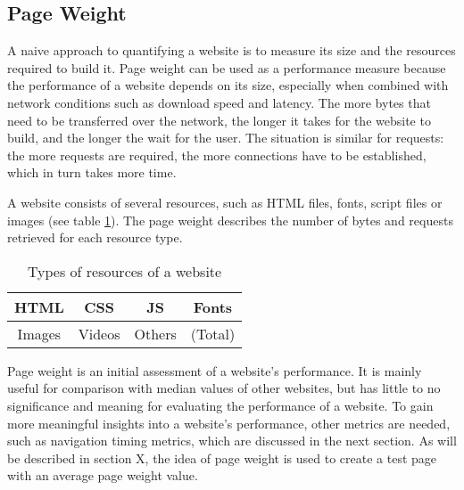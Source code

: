 




\subsection{Page Weight} %
\label{subsection:page_weight}

A naive approach to quantifying a website is to measure its size and the resources required to build it.
Page weight can be used as a performance measure because the performance of a website depends on its size, especially when combined with network conditions such as download speed and latency.
The more bytes that need to be transferred over the network, the longer it takes for the website to build, and the longer the wait for the user.
The situation is similar for requests: the more requests are required, the more connections have to be established, which in turn takes more time.

A website consists of several resources, such as HTML files, fonts, script files or images (see table \ref{table:website_resources}).
The page weight describes the number of bytes and requests retrieved for each resource type. %

\begin{table}[h]
	\small
	\centering
	\begin{tabular}{| c | c | c | c | }
	\hline
	HTML & CSS  & JS & Fonts \\
	\hline
	Images & Videos & Others & (Total) \\
	\hline
	\end{tabular}
	\medskip
	\caption{Types of resources of a website}
	\label{table:website_resources}
\end{table}

Page weight is an initial assessment of a website's performance.
It is mainly useful for comparison with median values of other websites, but has little to no significance and meaning for evaluating the performance of a website.
To gain more meaningful insights into a website's performance, other metrics are needed, such as navigation timing metrics, which are discussed in the next section.
As will be described in section X, the idea of page weight is used to create a test page with an average page weight value.


